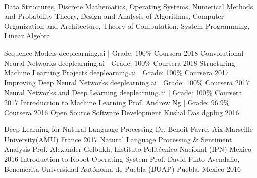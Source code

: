 \\Data Structures, Discrete Mathematics, Operating Systems, Numerical Methods and Probability Theory, Design and Analysis of Algorithms, Computer Organization and Architecture, Theory of Computation, System Programming, Linear Algebra

\begin{cvhonors}
  \cvhonor
    {Sequence Models}
    {deeplearning.ai | Grade: 100\%}
    {Coursera}
    {2018}
  \cvhonor
    {Convolutional Neural Networks}
    {deeplearning.ai | Grade: 100\%}
    {Coursera}
    {2018}
  \cvhonor
    {Structuring Machine Learning Projects}
    {deeplearning.ai | Grade: 100\%}
    {Coursera}
    {2017}
  \cvhonor
    {Improving Deep Neural Networks}
    {deeplearning.ai | Grade: 100\%}
    {Coursera}
    {2017}
  \cvhonor
    {Neural Networks and Deep Learning}
    {deeplearning.ai | Grade: 100\%}
    {Coursera}
    {2017}
  \cvhonor
    {Introduction to Machine Learning}
    {Prof. Andrew Ng | Grade: 96.9\%}
    {Coursera}
    {2016}
  \cvhonor
    {Open Source Software Development}
    {Kushal Das}
    {dgplug}
    {2016}
\end{cvhonors}

\begin{cvhonors}
  \cvhonor
    {Deep Learning for Natural Language Processing}
    {Dr. Benoit Favre, Aix-Marseille University(AMU)}
    {France}
    {2017}
  \cvhonor
    {Natural Language Processing \& Sentiment Analysis}
    {Prof. Alexander Gelbukh, Instituto Politécnico Nacional (IPN)}
    {Mexico}
    {2016}
  \cvhonor
    {Introduction to Robot Operating System}
    {Prof. David Pinto Avendaño, Benemérita Universidad Autónoma de Puebla (BUAP)}
    {Puebla, Mexico}
    {2016}
\end{cvhonors}


